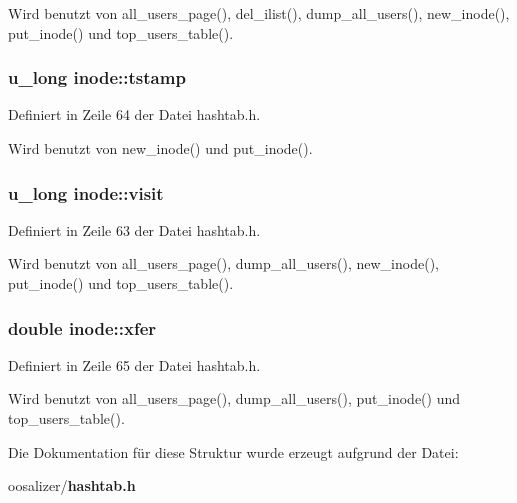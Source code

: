 Wird benutzt von all\_\-users\_\-page(), del\_\-ilist(), dump\_\-all\_\-users(), new\_\-inode(), put\_\-inode() und top\_\-users\_\-table().
\subsubsection{\setlength{\rightskip}{0pt plus 5cm}u\_\-long {\bf inode::tstamp}}\label{structinode_737deeb7e731e4f9db70427fd0854dfd}




Definiert in Zeile 64 der Datei hashtab.h.

Wird benutzt von new\_\-inode() und put\_\-inode().
\subsubsection{\setlength{\rightskip}{0pt plus 5cm}u\_\-long {\bf inode::visit}}\label{structinode_23fbc8ae83e74cc1ba882eef7b2a6948}




Definiert in Zeile 63 der Datei hashtab.h.

Wird benutzt von all\_\-users\_\-page(), dump\_\-all\_\-users(), new\_\-inode(), put\_\-inode() und top\_\-users\_\-table().
\subsubsection{\setlength{\rightskip}{0pt plus 5cm}double {\bf inode::xfer}}\label{structinode_a3dee5fe9d1b73fa4dfffc800e8a3cdf}




Definiert in Zeile 65 der Datei hashtab.h.

Wird benutzt von all\_\-users\_\-page(), dump\_\-all\_\-users(), put\_\-inode() und top\_\-users\_\-table().

Die Dokumentation f\"{u}r diese Struktur wurde erzeugt aufgrund der Datei:\begin{CompactItemize}
\item 
oosalizer/{\bf hashtab.h}\end{CompactItemize}
